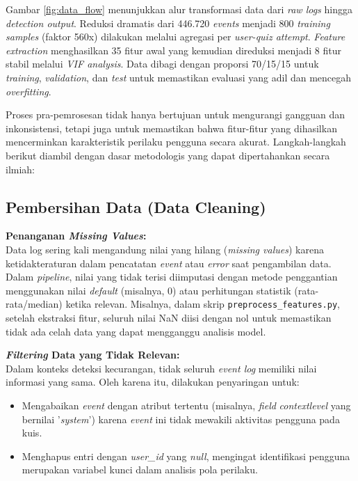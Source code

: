 Gambar \ref{fig:data_flow} menunjukkan alur transformasi data dari \textit{raw logs} hingga \textit{detection output}. Reduksi dramatis dari 446.720 \textit{events} menjadi 800 \textit{training samples} (faktor 560x) dilakukan melalui agregasi per \textit{user-quiz attempt}. \textit{Feature extraction} menghasilkan 35 fitur awal yang kemudian direduksi menjadi 8 fitur stabil melalui \textit{VIF analysis}. Data dibagi dengan proporsi 70/15/15 untuk \textit{training}, \textit{validation}, dan \textit{test} untuk memastikan evaluasi yang adil dan mencegah \textit{overfitting}.

Proses pra-pemrosesan tidak hanya bertujuan untuk mengurangi gangguan dan inkonsistensi, tetapi juga untuk memastikan bahwa fitur-fitur yang dihasilkan mencerminkan karakteristik perilaku pengguna secara akurat. Langkah-langkah berikut diambil dengan dasar metodologis yang dapat dipertahankan secara ilmiah:

\subsection{Pembersihan Data (Data Cleaning)}
\label{sec:pembersihanData}
\textbf{Penanganan \textit{Missing Values}:} \\
Data log sering kali mengandung nilai yang hilang (\textit{missing values}) karena ketidakteraturan dalam pencatatan \textit{event} atau \textit{error} saat pengambilan data. Dalam \textit{pipeline}, nilai yang tidak terisi diimputasi dengan metode penggantian menggunakan nilai \textit{default} (misalnya, 0) atau perhitungan statistik (rata-rata/median) ketika relevan. Misalnya, dalam skrip \texttt{preprocess\_features.py}, setelah ekstraksi fitur, seluruh nilai NaN diisi dengan nol untuk memastikan tidak ada celah data yang dapat mengganggu analisis model.

\textbf{\textit{Filtering} Data yang Tidak Relevan:} \\
Dalam konteks deteksi kecurangan, tidak seluruh \textit{event log} memiliki nilai informasi yang sama. Oleh karena itu, dilakukan penyaringan untuk:
\begin{itemize}
    \item Mengabaikan \textit{event} dengan atribut tertentu (misalnya, \textit{field} \textit{contextlevel} yang bernilai '\textit{system}') karena \textit{event} ini tidak mewakili aktivitas pengguna pada kuis.
    \item Menghapus entri dengan \textit{user\_id} yang \textit{null}, mengingat identifikasi pengguna merupakan variabel kunci dalam analisis pola perilaku.
\end{itemize}

